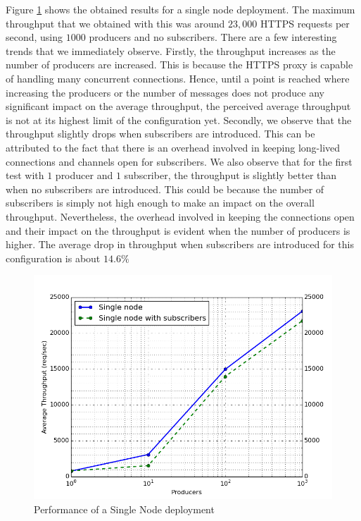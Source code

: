 \documentclass[conference, 10pt]{IEEEtran}
\begin{document}
Figure \ref{singlenode} shows the obtained results for a single node deployment. The maximum throughput that we obtained with this was around $23,000$ HTTPS requests per second, using $1000$ producers and no subscribers. There are a few interesting trends that we immediately observe. Firstly, the throughput increases as the number of producers are increased. This is because the HTTPS proxy is capable of handling many concurrent connections. Hence, until a point is reached where increasing the producers or the number of messages does not produce any significant impact on the average throughput, the perceived average throughput is not at its highest limit of the configuration yet. Secondly, we observe that the throughput slightly drops when subscribers are introduced. This can be attributed to the fact that there is an overhead involved in keeping long-lived connections and channels open for subscribers. We also observe that for the first test with $1$ producer and $1$ subscriber, the throughput is slightly better than when no subscribers are introduced. This could be because the number of subscribers is simply not high enough to make an impact on the overall throughput. Nevertheless, the overhead involved in keeping the connections open and their impact on the throughput is evident when the number of producers is higher. The average drop in throughput when subscribers are introduced for this configuration is about $14.6 \%$

\begin{figure}[H]
 \includegraphics[width=\linewidth, height=\linewidth, keepaspectratio]{1-node.png}
\caption{Performance of a Single Node deployment}
\label{singlenode}
\end{figure}
\end{document}
